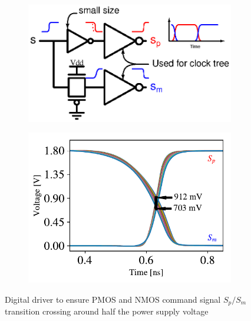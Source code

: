 \begin{figure}[htp]
	\centering
	\begin{subfigure}[b]{0.48\textwidth}
		\centering
		\includegraphics[width=\textwidth]{Chapter4/Figs/digital-driver.ps}
		\label{fig:dig-driver-ideal}
	\end{subfigure}
	\begin{subfigure}[b]{0.48\textwidth}
		\centering
		\includegraphics[width=\textwidth]{Chapter4/Figs/crossing-driver-with-tgate.pdf}
		\label{fig:dig-driver-crossing}
	\end{subfigure}
	\caption{Digital driver to ensure PMOS and NMOS command signal $S_p/S_m$ transition crossing around half the power supply voltage}
	\label{fig:dig-driver}
\end{figure}

